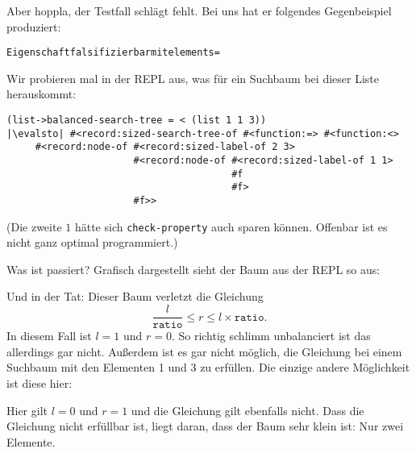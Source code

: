 Aber hoppla, der Testfall schlägt fehlt.  Bei uns hat er folgendes
Gegenbeispiel produziert:
%
\begin{alltt}
Eigenschaft falsifizierbar mit elements = 
\end{alltt}
%
Wir probieren mal in der REPL aus, was für ein Suchbaum bei dieser
Liste herauskommt:
%
\begin{lstlisting}
(list->balanced-search-tree = < (list 1 1 3))
|\evalsto| #<record:sized-search-tree-of #<function:=> #<function:<> 
     #<record:node-of #<record:sized-label-of 2 3>
                      #<record:node-of #<record:sized-label-of 1 1> 
                                       #f
                                       #f>
                      #f>>
\end{lstlisting}
%
(Die zweite $1$ hätte sich \lstinline{check-property} auch sparen
können.  Offenbar ist es nicht ganz optimal programmiert.)

Was ist passiert?  Grafisch dargestellt sieht der Baum aus der REPL so
aus:
%
\begin{center}
\end{center}
%
Und in der Tat: Dieser Baum verletzt die Gleichung
\[\frac{l}{\mathtt{ratio}} \leq r \leq l \times \mathtt{ratio}.\]
In diesem Fall ist $l=1$ und $r=0$.  So richtig schlimm unbalanciert
ist das allerdings gar nicht.  Außerdem ist es gar nicht möglich, die
Gleichung bei einem Suchbaum mit den Elementen 1 und 3 zu erfüllen.
Die einzige andere Möglichkeit ist diese hier:

%
\begin{center}
\end{center}
%
Hier gilt $l=0$ und $r=1$ und die Gleichung gilt ebenfalls nicht.
Dass die Gleichung nicht erfüllbar ist, liegt daran, dass der Baum
sehr klein ist: Nur zwei Elemente.

